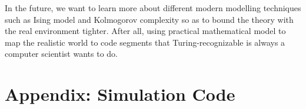 \documentclass[a4paper, 11pt]{article} %
\begin{document}
In the future, we want to learn more about different modern modelling techniques such as Ising model and Kolmogorov complexity so as to bound the theory with the real environment tighter. After all, using practical mathematical model to map the realistic world to code segments that Turing-recognizable is always a computer scientist wants to do.




\section*{Appendix:  Simulation Code}
\end{document}
